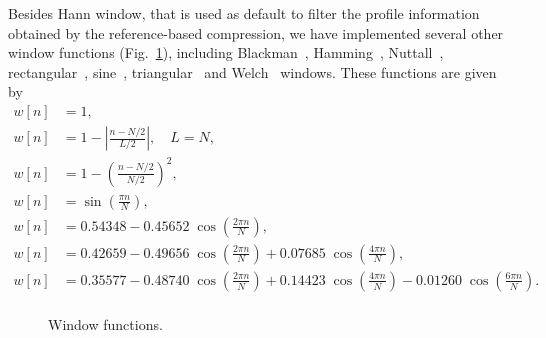 Besides Hann window, that is used as default to filter the profile information obtained by the reference-based compression, we have implemented several other window functions (Fig.~\ref{fig.filters}), including Blackman~\cite{blackman1959particular}, Hamming~\cite{tukey1949measuring}, Nuttall~\cite{nuttall1981some}, rectangular~\cite{oppenheim1999discrete}, sine~\cite{harris1978use}, triangular~\cite{bartlett1950periodogram} and Welch~\cite{welch1967use} windows. These functions are given by
\begin{align}
  w[n] &= 1,
  \tag*{(rectangular)} \\
  w[n] &= 1-\left|\tfrac {n-N/2}{L/2}\right|, \quad L=N,
  \tag*{(triangular/Bartlett)} \\
  w[n] &= 1-\left(\tfrac {n-N/2}{N/2}\right)^{2},
  \tag*{(Welch)} \\
  w[n] &= \sin \left(\tfrac {\pi n}{N}\right),
  \tag*{(sine)} \\
  w[n] &= 0.54348-0.45652\;\cos \left(\tfrac {2\pi n}{N}\right),
  \tag*{(Hamming)} \\
  w[n] &= 0.42659-0.49656\;\cos \left(\tfrac {2\pi n}{N}\right)+0.07685\;\cos \left(\tfrac {4\pi n}{N}\right),
  \tag*{(Blackman)} \\
  w[n] &= 0.35577-0.48740\;\cos \left(\tfrac {2\pi n}{N}\right)+0.14423\;\cos \left(\tfrac {4\pi n}{N}\right)-0.01260\;\cos \left(\tfrac {6\pi n}{N}\right).
  \tag*{(Nuttall)} \\
\end{align}

\begin{figure}[!h]
\centering
\caption{Window functions.}
\label{fig.filters}
\end{figure}